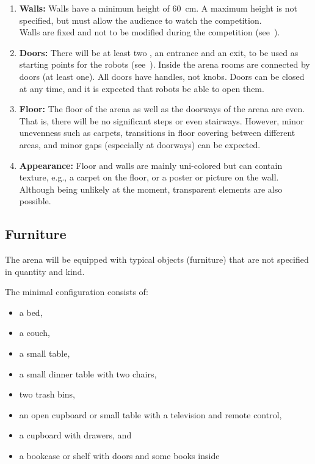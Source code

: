 \begin{enumerate}
	\item \textbf{Walls:} Walls have a minimum height of \SI{60}{\centi\meter}. A maximum height is not specified, but must allow the audience to watch the competition.\\
	Walls are fixed and not to be modified during the competition (see~).

	\item \textbf{Doors:} There will be at least two , an entrance and an exit, to be used as starting points for the robots (see~).
	Inside the arena rooms are connected by doors (at least one).
	All doors have handles, not knobs.
	Doors can be closed at any time, and it is expected that robots be able to open them.

	\item \textbf{Floor:} The floor of the arena as well as the doorways of the arena are even.
	That is, there will be no significant steps or even stairways.
	However, minor unevenness such as carpets, transitions in floor covering between different areas, and minor gaps (especially at doorways) can be expected.

	\item \textbf{Appearance:} Floor and walls are mainly uni-colored but can contain texture, e.g., a carpet on the floor, or a poster or picture on the wall.\\
	Although being unlikely at the moment, transparent elements are also possible.
\end{enumerate}


\subsection{Furniture}
\label{rule:scenario_furniture}
The arena will be equipped with typical objects (furniture) that are not specified in quantity and kind.

The minimal configuration consists of:
\begin{itemize}
	\item a bed,
	\item a couch,
	\item a small table,
	\item a small dinner table with two chairs,
	\item two trash bins,
	\item an open cupboard or small table with a television and remote control,
	\item a cupboard with drawers, and
	\item a bookcase or shelf with doors and some books inside
\end{itemize}

